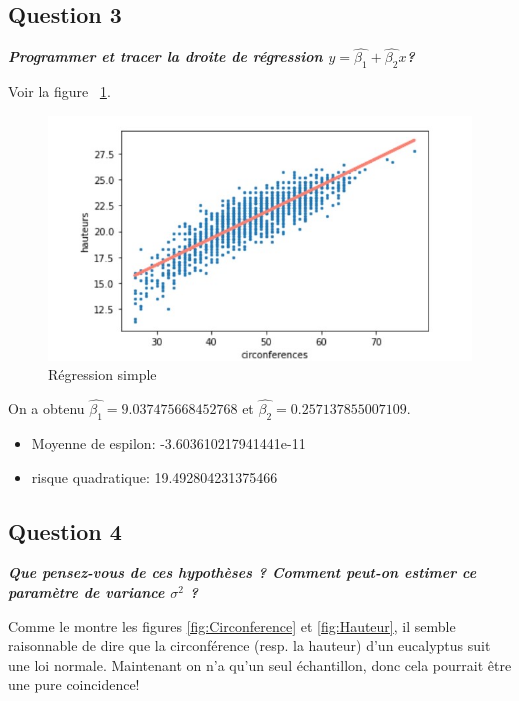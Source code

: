 \documentclass[pdflatex]{article}
\theoremstyle{definition}
\newcommand{\quest}[1]{\textbf{\textit{#1}} \vspace{3mm}}
\begin{document}
\subsection*{Question 3}
\quest{Programmer et tracer la droite de r\'egression $y = \hat{\beta_1} + \hat{\beta_2}x$?}

Voir la figure ~\ref{fig:regression simple}.
\begin{figure}
	\includegraphics[scale=1]{regression_simple.jpg}
    \caption{R\'egression simple}
    \label{fig:regression simple}
\end{figure}

On a obtenu $\hat{\beta_1} =  9.037475668452768$  et $\hat{\beta_2} = 0.257137855007109$.

\begin{itemize}
    \item Moyenne de espilon: -3.603610217941441e-11
    \item risque quadratique: 19.492804231375466
\end{itemize}
    
\subsection*{Question 4}
\quest{Que pensez-vous de ces hypoth\`eses ? Comment peut-on estimer ce param\`etre de variance $\sigma^2$ ?}

Comme le montre les figures \ref{fig:Circonference} et \ref{fig:Hauteur}, il semble raisonnable de dire que la circonf\'erence (resp. la hauteur) d'un eucalyptus suit une loi normale. Maintenant on n'a qu'un seul \'echantillon, donc cela pourrait \^etre une pure coincidence!
\end{document}
